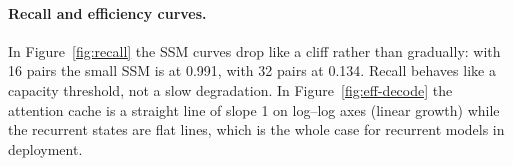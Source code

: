 \paragraph{Recall and efficiency curves.} In Figure~\ref{fig:recall} the SSM curves drop like a cliff rather than
gradually: with 16 pairs the small SSM is at 0.991, with 32 pairs at 0.134. Recall behaves like a capacity
threshold, not a slow degradation. In Figure~\ref{fig:eff-decode} the attention cache is a straight line of
slope 1 on log--log axes (linear growth) while the recurrent states are flat lines, which is the whole case for
recurrent models in deployment.
